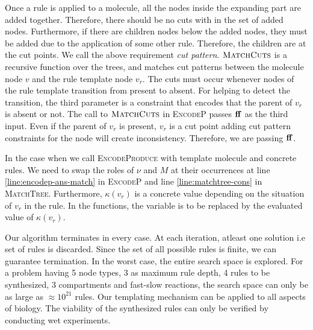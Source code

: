 Once a rule is applied to a molecule, all the
nodes inside the expanding part are added together.
Therefore, there should be no cuts with in the set of added nodes.
Furthermore, if there are children nodes below the added nodes,
they must be added due to the application of some other rule.
Therefore, the children are at the cut points.
We call the above requirement {\em cut pattern}. 
$\textsc{MatchCuts}$ is a recursive function over the trees, and matches
cut patterns between the molecule node $v$ and the rule template node $v_r$.
The cuts must occur whenever nodes of the rule template transition
from present to absent.
For helping to detect the transition,
the third parameter is a constraint that encodes that the parent of $v_r$
is absent or not.
The call to $\textsc{MatchCuts}$ in \textsc{EncodeP} passes $\mathbf{ff}$ as the third input.
Even if the parent of $v_r$ is present,
$v_r$ is a cut point adding cut pattern constraints for the node will create inconsistency.
Therefore, we are passing $\mathbf{ff}$.

In the case when we call \textsc{EncodeProduce} with template molecule and
concrete rules.
We need to swap the roles of $\nu$ and $M$ at their occurrences
at line \ref{line:encodep-ans-match} in \textsc{EncodeP} and
line \ref{line:matchtree-cons} in \textsc{MatchTree}.
Furthermore, $\kappa(v_r)$ is a concrete value depending on the situation of $v_r$ in
the rule.
In the functions, the variable is to be replaced by the
evaluated value of $\kappa(v_r)$.


Our algorithm terminates in every case. At each iteration, atleast one solution i.e set of rules is discarded. Since the set of all possible rules is finite, we can guarantee termination. In the worst case, the entire search space is explored. For a problem having 5 node types, 3 as maximum rule depth, 4 rules to be synthesized, 3 compartments and fast-slow reactions, the search space can only be as large as $\approx 10^{21}$ rules.
Our templating mechanism can be applied to all aspects of biology. The viability of the synthesized rules can only be verified by conducting wet experiments.




